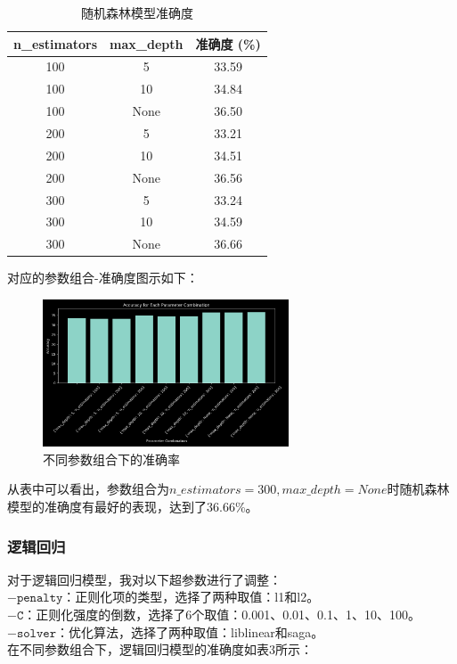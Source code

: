\documentclass[12pt,a4paper]{article}
\begin{document}
\begin{table}[H]
    \centering
    \caption{随机森林模型准确度}
    \label{tab:rf_performance}
    \begin{tabular}{ccc}
      \toprule
      n\_estimators & max\_depth & 准确度 (\%) \\
      \midrule
      100 & 5 & 33.59 \\
      100 & 10 & 34.84 \\   
      100 & None & 36.50 \\
      200 & 5 & 33.21 \\
      200 & 10 & 34.51 \\
      200 & None & 36.56 \\
      300 & 5 & 33.24\\
      300 & 10 & 34.59 \\
      300 & None & 36.66 \\
      \bottomrule
    \end{tabular}
  \end{table}
  对应的参数组合-准确度图示如下：
\begin{figure}[H]
    \centering
    \includegraphics[width=0.65\textwidth]{plot3.png}
    \caption{不同参数组合下的准确率}
\end{figure}
从表中可以看出，参数组合为$n\_estimators=300, max\_depth=None$时随机森林模型的准确度有最好的表现，达到了36.66\%。

\subsubsection{逻辑回归}
对于逻辑回归模型，我对以下超参数进行了调整：\\
$- \texttt{penalty}$：正则化项的类型，选择了两种取值：l1和l2。\\
$- \texttt{C}$：正则化强度的倒数，选择了6个取值：0.001、0.01、0.1、1、10、100。\\
$- \texttt{solver}$：优化算法，选择了两种取值：liblinear和saga。\\
在不同参数组合下，逻辑回归模型的准确度如表3所示：
\end{document}
